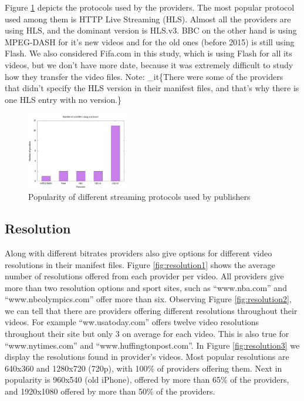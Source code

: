 \documentclass[]{sig-alternate-10pt}
\begin{document}
Figure \ref{fig:protocols} depicts the protocols used by the providers.
The most popular protocol used among them is HTTP Live Streaming (HLS).
Almost all the providers are using HLS, and the dominant version is
HLS.v3. BBC on the other hand is using MPEG-DASH for it's new videos and
for the old ones (before 2015) is still using Flash. We also considered
Fifa.com in this study, which is using Flash for all its videos, but we
don't have more date, because it was extremely difficult to study how
they transfer the video files. Note: \text\_it\{There were some of the
providers that didn't specify the HLS version in their manifest files,
and that's why there is one HLS entry with no version.\}

\begin{figure}


\centering
\includegraphics[width=0.4\textwidth]{protocol_bar_plot.jpg}
\caption{Popularity of different streaming protocols used by publishers}
\label{fig:protocols}
\end{figure}

\hypertarget{resolution}{%
\subsection{Resolution}\label{resolution}}

Along with different bitrates providers also give options for different
video resolutions in their manifest files. Figure \ref{fig:resolution1}
shows the average number of resolutions offered from each provider per
video. All providers give more than two resolution options and sport
sites, such as ``www.nba.com'' and ``www.nbcolympics.com'' offer more
than six. Observing Figure \ref{fig:resolution2}, we can tell that there
are providers offering different resolutions throughout their videos.
For example ``ww.usatoday.com'' offers twelve video resolutions
throughout their site but only 3 on average for each video. This is also
true for ``www.nytimes.com'' and ``www.huffingtonpost.com''. In Figure
\ref{fig:resolution3} we display the resolutions found in provider's
videos. Most popular resolutions are 640x360 and 1280x720 (720p), with
100\% of providers offering them. Next in popularity is 960x540 (old
iPhone), offered by more than 65\% of the providers, and 1920x1080
offered by more than 50\% of the providers.
\end{document}
